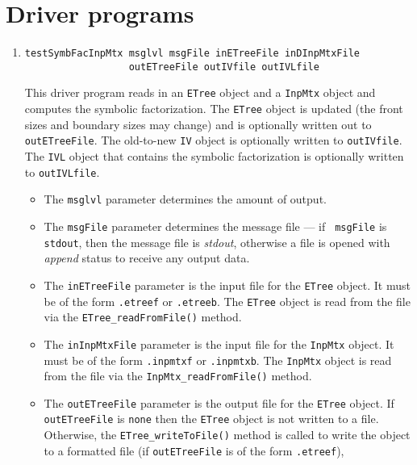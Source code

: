 \par
\section{Driver programs }
\label{section:SymbFac:drivers}
\par
\begin{enumerate}
\item
\begin{verbatim}
testSymbFacInpMtx msglvl msgFile inETreeFile inDInpMtxFile
                  outETreeFile outIVfile outIVLfile
\end{verbatim}
This driver program reads in an {\tt ETree} object and a {\tt InpMtx}
object and computes the symbolic factorization.
The {\tt ETree} object is updated (the front sizes and boundary
sizes may change) and is optionally written out to {\tt outETreeFile}.
The old-to-new {\tt IV} object is optionally written to
{\tt outIVfile}.
The {\tt IVL} object that contains the symbolic factorization is
optionally written to {\tt outIVLfile}.
\par
\begin{itemize}
\item
The {\tt msglvl} parameter determines the amount of output.
\item
The {\tt msgFile} parameter determines the message file --- if {\tt
msgFile} is {\tt stdout}, then the message file is {\it stdout},
otherwise a file is opened with {\it append} status to receive any
output data.
\item
The {\tt inETreeFile} parameter is the input file 
for the {\tt ETree} object. 
It must be of the form {\tt *.etreef} or {\tt *.etreeb}.
The {\tt ETree} object is read from the file via the
{\tt ETree\_readFromFile()} method.
\item
The {\tt inInpMtxFile} parameter is the input file 
for the {\tt InpMtx} object. 
It must be of the form {\tt *.inpmtxf} or {\tt *.inpmtxb}.
The {\tt InpMtx} object is read from the file via the
{\tt InpMtx\_readFromFile()} method.
\item
The {\tt outETreeFile} parameter is the output file for the 
{\tt ETree} object. 
If {\tt outETreeFile} is {\tt none} then the {\tt ETree} object is not
written to a file. 
Otherwise, the {\tt ETree\_writeToFile()} method is called to write
the object to 
a formatted file (if {\tt outETreeFile} is of the form 
{\tt *.etreef}),

\end{itemize}
\end{enumerate}
